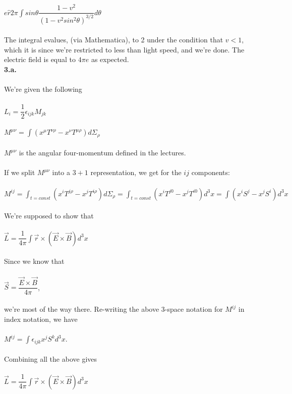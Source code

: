 \documentclass[prb,preprint]
{revtex4-1}
\newcommand{\PRLsep}{\noindent\makebox[\linewidth]{\resizebox{0.8888\linewidth}{2pt}{$\bullet$}}\bigskip}
\begin{document}
\\
\\
$e\hat{r}2 \pi\int sin \theta\dfrac{1-v^2}{\left(1-v^2sin^2\theta\right)^{3/2}} d\theta$
\\
\\
The integral evalues, (via Mathematica), to 2 under the condition that $v < 1$, which it is since we're restricted to less than light speed, and we're done.  The electric field is equal to $4\pi e$ as expected.
\\
\PRLsep
\newpage
\textbf{3.a.}
\\
\\
We're given the following
\\
\\
$L_i = \dfrac{1}{2}\epsilon_{ijk}M_{jk}$
\\
\\
$M^{\mu\nu} = \int \left(x^\mu T^{\nu\rho} - x^\nu T^{\mu\rho}\right)d\Sigma_\rho$
\\
\\
$M^{\mu\nu}$ is the angular four-momentum defined in the lectures.
\\
\\
If we split $M^{\mu\nu}$ into a $3+1$ representation, we get for the $ij$ components:
\\
\\
$M^{ij} = \int_{t=const} \left(x^i T^{j\rho} - x^j T^{i\rho}\right)d\Sigma_\rho = \int_{t=const} \left(x^i T^{j0} - x^j T^{i0}\right)d^3 x =\int \left(x^i S^j - x^j S^i\right)d^3 x$
\\
\\
We're supposed to show that 
\\
\\
$\vec{L} = \dfrac{1}{4\pi}\int\vec{r}\times\left(\vec{E}\times\vec{B}\right)d^3 x$
\\
\\
Since we know that
\\
\\
$\vec{S} = \dfrac{\vec{E}\times\vec{B}}{4\pi}$,
\\
\\
we're most of the way there.  Re-writing the above 3-space notation for $M^{ij}$ in index notation, we have 
\\
\\
$M^{ij} = \int \epsilon_{ijk}x^j S^k d^3 x$.
\\
\\
Combining all the above gives
\\
\\
$\vec{L} = \dfrac{1}{4\pi}\int\vec{r}\times\left(\vec{E}\times\vec{B}\right)d^3 x$
\end{document}
